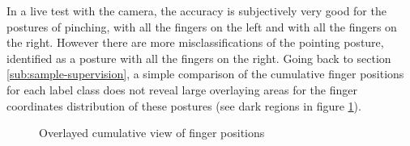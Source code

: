 In a live test with the camera, the accuracy is subjectively very good for the postures of pinching, with all the fingers on the left and with all the fingers on the right. However there are more misclassifications of the pointing posture, identified as a posture with all the fingers on the right. Going back to section \ref{sub:sample-supervision}, a simple comparison of the cumulative finger positions for each label class does not reveal large overlaying areas for the finger coordinates distribution of these postures (see dark regions in figure \ref{fig:cumulative-comparision}).

\begin{figure}[H]
	\centering
	\hspace{0.01\textwidth}
	\hspace{0.01\textwidth}

	\caption{Overlayed cumulative view of finger positions}
	\label{fig:cumulative-comparision}
\end{figure}

